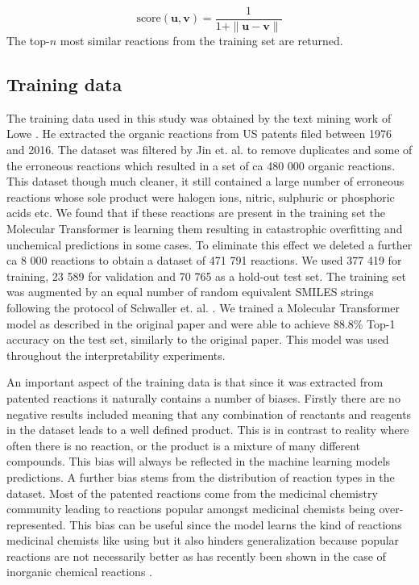 \begin{equation}
    \textrm{score}(\textbf{u},\textbf{v}) = \frac{1}{1 + \|\textbf{u} - \textbf{v} \|}
\end{equation}
The top-$n$ most similar reactions from the training set are returned. 

\subsection*{Training data}
The training data used in this study was obtained by the text mining work of Lowe \cite{Lowe2012}. He extracted the organic reactions from US patents filed between 1976 and 2016. The dataset was filtered by Jin et. al. \cite{Jin2017} to remove duplicates and some of the erroneous reactions which resulted in a set of ca 480 000 organic reactions. This dataset though much cleaner, it still contained a large number of erroneous reactions whose sole product were halogen ions, nitric, sulphuric or phosphoric acids etc. We found that if these reactions are present in the training set the Molecular Transformer is learning them resulting in catastrophic overfitting and unchemical predictions in some cases. To eliminate this effect we deleted a further ca 8 000 reactions to obtain a dataset of 471 791 reactions. We used 377 419 for training, 23 589 for validation and 70 765 as a hold-out test set. The training set was augmented by an equal number of random equivalent SMILES strings following the protocol of Schwaller et. al. \cite{Schwaller2019}. We trained a Molecular Transformer model as described in the original paper and were able to achieve 88.8\% Top-1 accuracy on the test set, similarly to the original paper. This model was used throughout the interpretability experiments.

An important aspect of the training data is that since it was extracted from patented reactions it naturally contains a number of biases. Firstly there are no negative results included meaning that any combination of reactants and reagents in the dataset leads to a well defined product. This is in contrast to reality where often there is no reaction, or the product is a mixture of many different compounds. This bias will always be reflected in the machine learning models predictions. A further bias stems from the distribution of reaction types in the dataset. Most of the patented reactions come from the medicinal chemistry community leading to reactions popular amongst medicinal chemists being over-represented. This bias can be useful since the model learns the kind of reactions medicinal chemists like using \cite{Bjerrun2020} but it also hinders generalization because popular reactions are not necessarily better as has recently been shown in the case of inorganic chemical reactions \cite{Jia2019}.

